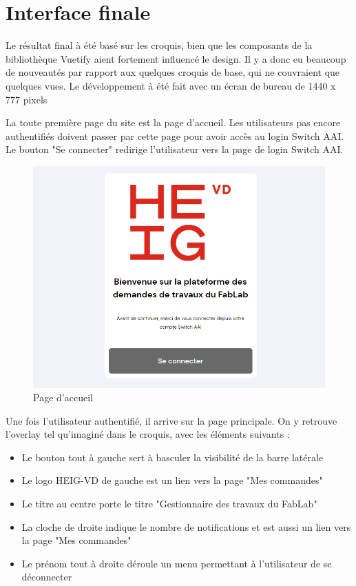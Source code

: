 \documentclass[
    iai, %
    eai, %
]{heig-tb}
\begin{document}
\newpage
\section{Interface finale}
Le résultat final à été basé sur les croquis, bien que les composants de la bibliothèque Vuetify aient fortement influencé le design.
Il y a donc eu beaucoup de nouveautés par rapport aux quelques croquis de base, qui ne couvraient que quelques vues.
Le développement à été fait avec un écran de bureau de 1440 x 777 pixels

La toute première page du site est la page d'accueil. Les utilisateurs pas encore authentifiés doivent passer par cette page pour avoir accès au login Switch AAI.
Le bouton "Se connecter" redirige l'utilisateur vers la page de login Switch AAI.

\begin{figure}[h]
  \includegraphics[width=14cm]{ui_welcome.PNG}
  \caption{Page d'accueil}
\end{figure}

Une fois l'utilisateur authentifié, il arrive sur la page principale.
On y retrouve l'overlay tel qu'imaginé dans le croquis, avec les éléments suivants :
\begin{itemize}
  \item Le bouton tout à gauche sert à basculer la visibilité de la barre latérale
  \item Le logo HEIG-VD de gauche est un lien vers la page "Mes commandes"
  \item Le titre au centre porte le titre "Gestionnaire des travaux du FabLab"
  \item La cloche de droite indique le nombre de notifications et est aussi un lien vers la page "Mes commandes"
  \item Le prénom tout à droite déroule un menu permettant à l'utilisateur de se déconnecter
\end{itemize}
\bigskip
\end{document}
